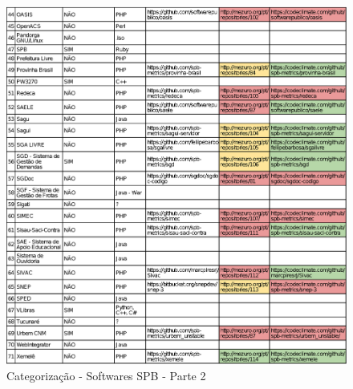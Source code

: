 \begin{anexosenv}
\begin{figure}[!htb]
	\centering
    \includegraphics[keepaspectratio=true,scale=0.85]
    {tabelas/spb_2.eps}
  \caption{Categorização - Softwares SPB - Parte 2}
  \label{fig:softwares_spb_2}
\end{figure}

\end{anexosenv}
